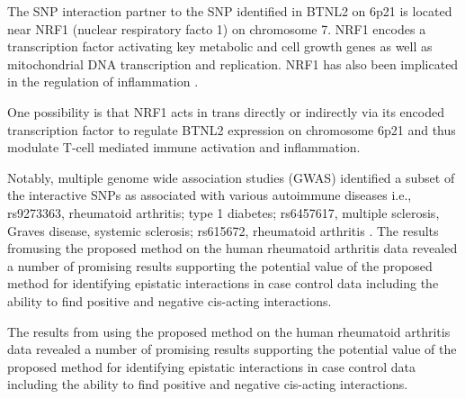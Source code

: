 \documentclass[preprint,12pt,3p]{elsarticle}
\begin{document}
The SNP interaction partner to the SNP identified in BTNL2 on 6p21 is located near NRF1 (nuclear respiratory facto 1) on
chromosome 7. NRF1 encodes a transcription factor activating key metabolic and cell growth genes as well as
mitochondrial DNA transcription and replication. NRF1 has also been implicated in the regulation of inflammation
\cite[]{stelzerGeneCardsSuiteGene2016,vantienenProlongedNrf1Overexpression2010, yangNglycanaseNGLY1Regulates2018}.


One possibility is that NRF1 acts in trans directly or indirectly via its encoded transcription factor to regulate BTNL2
expression on chromosome 6p21 and thus modulate T-cell mediated immune activation and inflammation.

Notably, multiple genome wide association studies (GWAS) identified a subset of the interactive SNPs as associated with
various autoimmune diseases i.e., rs9273363, rheumatoid arthritis; type 1 diabetes; rs6457617, multiple sclerosis,
Graves disease, systemic sclerosis; rs615672, rheumatoid arthritis \cite[]{UCSC.2022}.
The results fromusing the proposed method on the human rheumatoid arthritis data revealed a number of promising results supporting the
potential value of the proposed method for identifying epistatic interactions in case control data including the
ability to find positive and negative cis-acting interactions.

The results from using the proposed method on the human rheumatoid arthritis data revealed a number of promising results
supporting the potential value of the proposed method for identifying epistatic interactions in case control data
including the ability to find positive and negative cis-acting interactions.
\end{document}
